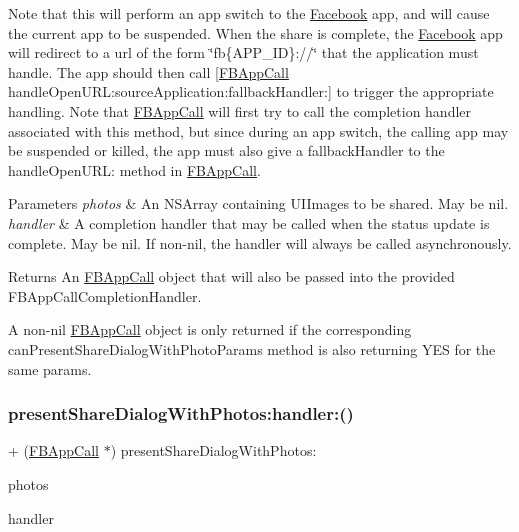 Note that this will perform an app switch to the \hyperlink{interfaceFacebook}{Facebook} app, and will cause the current app to be suspended. When the share is complete, the \hyperlink{interfaceFacebook}{Facebook} app will redirect to a url of the form \char`\"{}fb\{\+A\+P\+P\+\_\+\+I\+D\}\+://\char`\"{} that the application must handle. The app should then call \mbox{[}\hyperlink{interfaceFBAppCall}{F\+B\+App\+Call} handle\+Open\+U\+R\+L\+:source\+Application\+:fallback\+Handler\+:\mbox{]} to trigger the appropriate handling. Note that \hyperlink{interfaceFBAppCall}{F\+B\+App\+Call} will first try to call the completion handler associated with this method, but since during an app switch, the calling app may be suspended or killed, the app must also give a fallback\+Handler to the handle\+Open\+U\+RL\+: method in \hyperlink{interfaceFBAppCall}{F\+B\+App\+Call}.


\begin{DoxyParams}{Parameters}
{\em photos} & An N\+S\+Array containing U\+I\+Images to be shared. May be nil.\\
\hline
{\em handler} & A completion handler that may be called when the status update is complete. May be nil. If non-\/nil, the handler will always be called asynchronously.\\
\hline
\end{DoxyParams}
\begin{DoxyReturn}{Returns}
An \hyperlink{interfaceFBAppCall}{F\+B\+App\+Call} object that will also be passed into the provided F\+B\+App\+Call\+Completion\+Handler.
\end{DoxyReturn}
A non-\/nil \hyperlink{interfaceFBAppCall}{F\+B\+App\+Call} object is only returned if the corresponding can\+Present\+Share\+Dialog\+With\+Photo\+Params method is also returning Y\+ES for the same params. \mbox{\label{interfaceFBDialogs_aeaf0798a6057ed03c6a3cc26aa624a27}} 
\subsubsection{\texorpdfstring{present\+Share\+Dialog\+With\+Photos\+:handler\+:()}{presentShareDialogWithPhotos:handler:()}\hspace{0.1cm}{\footnotesize\ttfamily [2/5]}}
{\footnotesize\ttfamily + (\hyperlink{interfaceFBAppCall}{F\+B\+App\+Call} $\ast$) present\+Share\+Dialog\+With\+Photos\+: \begin{DoxyParamCaption}\item[{(N\+S\+Array $\ast$)}]{photos }\item[{handler:(F\+B\+Dialog\+App\+Call\+Completion\+Handler)}]{handler }\end{DoxyParamCaption}}

